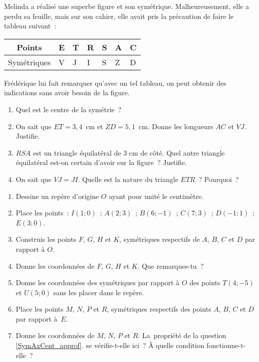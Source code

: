 \begin{exercice}
Melinda a réalisé une superbe figure et son symétrique. Malheureusement, elle a perdu sa feuille, mais sur son cahier, elle avait pris la précaution de faire le tableau suivant :
\begin{center}
\begin{tabularx}{0.9\linewidth}{|c|X|X|X|X|X|X|}
\hline
Points & E & T & R & S & A & C \\ \hline
Symétriques & V & J & I & S & Z & D\\ \hline
 \end{tabularx}
 \end{center}
Frédérique lui fait remarquer qu'avec un tel tableau, on peut obtenir des indications sans avoir besoin de la figure.
\begin{enumerate}
 \item Quel est le centre de la symétrie ?
 \item On sait que $ET = 3,4$ cm et $ZD = 5,1$ cm. Donne les longueurs $AC$ et $VJ$. Justifie.
 \item $RSA$ est un triangle équilatéral de 3 cm de côté. Quel autre triangle équilatéral est-on certain d'avoir sur la figure ? Justifie.
 \item On sait que $VJ = JI$. Quelle est la nature du triangle $ETR$ ? Pourquoi ?
 \end{enumerate}
\end{exercice}


\begin{exercice}
\begin{enumerate}
 \item Dessine un repère d'origine $O$ ayant pour unité le centimètre.
 \item Place les points : $I (1 ; 0)$ ; $A (2 ; 3)$ ; $B (6 ; - 1)$ ; $C (7 ; 3)$ ; $D (- 1 ; 1)$ ; $E (3 ; 0)$.
 \item Construis les points $F$, $G$, $H$ et $K$, symétriques respectifs de $A$, $B$, $C$ et $D$ par rapport à $O$.
 \item Donne les coordonnées de $F$, $G$, $H$ et $K$. Que remarques-tu ? \label{SymAxCent_approf}
 \item Donne les coordonnées des symétriques par rapport à $O$ des points $T (4 ; - 5)$ et $U (5 ; 0)$ sans les placer dans le repère.
 \item Place les points $M$, $N$, $P$ et $R$, symétriques respectifs des points $A$, $B$, $C$ et $D$ par rapport à $E$.
 \item Donne les coordonnées de $M$, $N$, $P$ et $R$. La propriété de la question \ref{SymAxCent_approf}. se vérifie-t-elle ici ? À quelle condition fonctionne-t-elle ?
 \end{enumerate}
\end{exercice}


